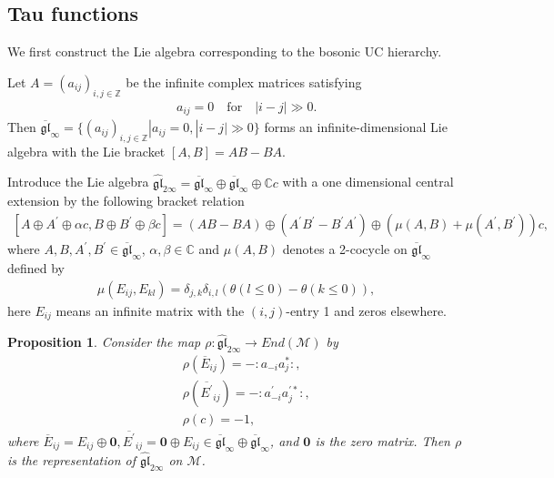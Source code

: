 \documentclass[10pt,a4paper]{amsart}
\numberwithin{equation}{section}
\newtheorem{proposition}[theorem]{Proposition}
\begin{document}
\subsection{Tau functions}
We first construct the Lie algebra corresponding to the bosonic UC hierarchy.

Let $A=(a_{ij})_{i,j\in\mathbb{Z}}$ be the infinite complex matrices satisfying
\begin{eqnarray}\label{a_martix}
&&a_{ij}=0\quad \text{for}\quad |i-j|\gg0.
\end{eqnarray}
Then $\mathfrak{\overline{gl}}_{\infty}=\{(a_{ij})_{i,j\in\mathbb{Z}}|a_{ij}=0,|i-j|\gg0\}$ forms an infinite-dimensional Lie algebra with the Lie bracket $[A,B]=AB-BA$.

Introduce the Lie algebra $\mathfrak{\widehat{gl}}_{2\infty}=\mathfrak{\overline{gl}}_{\infty}\oplus
\mathfrak{\overline{gl}}_{\infty}\oplus\mathbb{C}c$ with a one dimensional central extension by the following bracket relation
\begin{eqnarray}\label{affine_bracket}
[A\oplus A^{\prime}\oplus\alpha c,B\oplus B^{\prime}\oplus\beta c]=(AB-BA)\oplus(A^{\prime}B^{\prime}-B^{\prime}A^{\prime})\oplus
\left(\mu(A,B)+\mu(A^{\prime},B^{\prime})\right)c,
\end{eqnarray}
where $A,B,A^{\prime},B^{\prime}\in\mathfrak{\overline{gl}}_{\infty}$, $\alpha,\beta\in\mathbb{C}$ and $\mu(A,B)$ denotes a 2-cocycle on $\mathfrak{\overline{gl}}_{\infty}$ defined by
\begin{eqnarray}
\mu(E_{ij},E_{kl})=\delta_{j,k}\delta_{i,l}\left(\theta(l\leq0)-\theta(k\leq0)\right),
\end{eqnarray}
here $E_{ij}$ means an infinite matrix with the $(i,j)$-entry 1 and zeros elsewhere.

\begin{proposition}
Consider the map $\rho:\mathfrak{\widehat{gl}}_{2\infty}\rightarrow End(\mathcal{M})$ by
\begin{eqnarray}
&&\rho(\overline{E}_{ij})=-:a_{-i}a^{\ast}_{j}:,\\
&&\rho(\overline{E^{\prime}}_{ij})=-:a^{\prime}_{-i}a^{\prime\ast}_{j}:,\\
&&\rho(c)=-1,
\end{eqnarray}
where $\overline{E}_{ij}=E_{ij}\oplus\mathbf{0}, \overline{E^{\prime}}_{ij}=\mathbf{0}
\oplus{E}_{ij}\in \mathfrak{\overline{gl}}_{\infty}\oplus
\mathfrak{\overline{gl}}_{\infty}$, and $\mathbf{0}$ is the zero matrix. Then $\rho$ is the representation of $\mathfrak{\widehat{gl}}_{2\infty}$ on $\mathcal{M}$.
\end{proposition}
\end{document}
